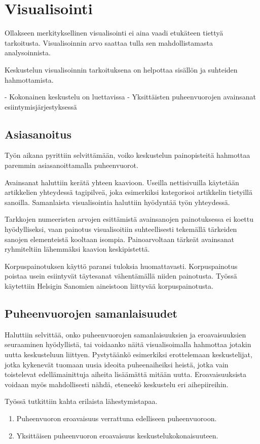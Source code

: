 \documentclass[11pt,a4paper,oneside]{memoir}
\begin{document}
\chapter{Visualisointi}

Ollakseen merkityksellinen visualisointi ei aina vaadi etukäteen tiettyä tarkoitusta. Visualisoinnin arvo saattaa tulla sen mahdollistamasta analysoinnista.

Keskustelun visualisoinnin tarkoituksena on helpottaa sisällön ja suhteiden hahmottamista.

- Kokonainen keskustelu on luettavissa
- Yksittäisten puheenvuorojen avainsanat esiintymisjärjestyksessä

\section{Asiasanoitus}
Työn aikana pyrittiin selvittämään, voiko keskustelun painopisteitä hahmottaa paremmin asiasanoittamalla puheenvuorot. 

Avainsanat haluttiin kerätä yhteen kaavioon. Useilla nettisivuilla käytetään artikkelien yhteydessä tagipilveä, joka esimerkiksi kategorisoi artikkelin tietyillä sanoilla. Samanlaista visualisointia haluttiin hyödyntää työn yhteydessä.

Tarkkojen numeeristen arvojen esittämistä avainsanojen painotuksessa ei koettu hyödylliseksi, vaan painotus visualisoitiin suhteellisesti tekemällä tärkeiden sanojen elementeistä kooltaan isompia. Painoarvoltaan tärkeät avainsanat ryhmiteltiin lähemmäksi kaavion keskipistettä.

Korpuspainotuksen käyttö paransi tuloksia huomattavasti. Korpuspainotus poistaa usein esiintyvät täytesanat vähentämällä niiden painotusta. Työssä käytettiin Helsigin Sanomien aineistoon liittyvää korpuspainotusta.

\section{Puheenvuorojen samanlaisuudet}
Haluttiin selvittää, onko puheenvuorojen samanlaisuuksien ja eroavaisuuksien seuraaminen hyödyllistä, tai voidaanko näitä visualisoimalla hahmottaa jotakin uutta keskusteluun liittyen. Pystytäänkö esimerkiksi erottelemaan keskustelijat, jotka kykenevät tuomaan uusia ideoita puheenaiheiksi heistä, jotka vain toistelevat edellämainittuja aiheita lisäämättä mitään uutta. Eroavaisuuksista voidaan myös mahdollisesti nähdä, eteneekö keskustelu eri aihepiireihin.

Työssä tutkittiin kahta erilaista lähestymistapaa.
\begin{enumerate}
\item Puheenvuoron eroavaisuus verrattuna edelliseen puheenvuoroon.
\item Yksittäisen puheenvuoron eroavaisuus keskustelukokonaisuuteen.
\end{enumerate}
\end{document}
